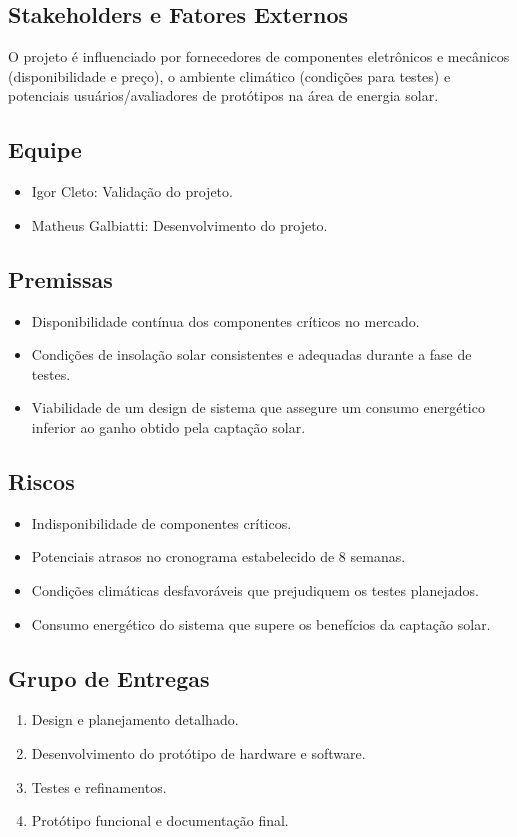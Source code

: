 \documentclass{article}
\begin{document}
\subsection{Stakeholders e Fatores Externos}
O projeto é influenciado por fornecedores de componentes eletrônicos e mecânicos (disponibilidade e preço), o ambiente climático (condições para testes) e potenciais usuários/avaliadores de protótipos na área de energia solar.

\subsection{Equipe}
\begin{itemize}
    \item Igor Cleto: Validação do projeto.
    \item Matheus Galbiatti: Desenvolvimento do projeto.
\end{itemize}

\subsection{Premissas}
\begin{itemize}
    \item Disponibilidade contínua dos componentes críticos no mercado.
    \item Condições de insolação solar consistentes e adequadas durante a fase de testes.
    \item Viabilidade de um design de sistema que assegure um consumo energético inferior ao ganho obtido pela captação solar.
\end{itemize}

\subsection{Riscos}
\begin{itemize}
    \item Indisponibilidade de componentes críticos.
    \item Potenciais atrasos no cronograma estabelecido de 8 semanas.
    \item Condições climáticas desfavoráveis que prejudiquem os testes planejados.
    \item Consumo energético do sistema que supere os benefícios da captação solar.
\end{itemize}

\subsection{Grupo de Entregas}
\begin{enumerate}
    \item Design e planejamento detalhado.
    \item Desenvolvimento do protótipo de hardware e software.
    \item Testes e refinamentos.
    \item Protótipo funcional e documentação final.
\end{enumerate}
\end{document}
